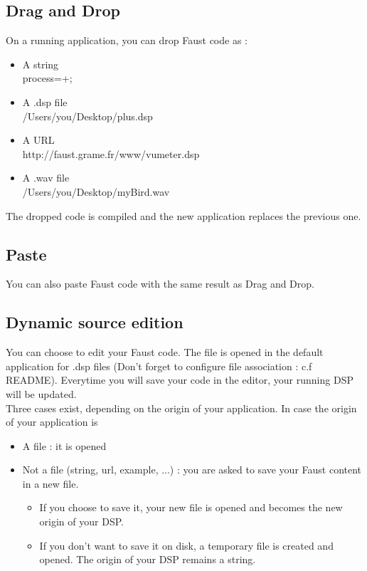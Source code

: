 \documentclass[a4paper]{article}
\begin{document}
\subsection{Drag and Drop}
On a running application, you can drop Faust code as :
\begin{itemize}
\item A string \\process=+;
\item A .dsp file \\/Users/you/Desktop/plus.dsp
\item A URL \\http://faust.grame.fr/www/vumeter.dsp
\item A .wav file \\/Users/you/Desktop/myBird.wav
\end{itemize}
The dropped code is compiled and the new application replaces the previous one.

\subsection{Paste} 
You can also paste Faust code with the same result as Drag and Drop.

\subsection{Dynamic source edition}
You can choose to edit your Faust code. The file is opened in the default application for .dsp files (Don't forget to configure file association : c.f README). Everytime you will save your code in the editor, your running DSP will be updated. \\

Three cases exist, depending on the origin of your application. In case the origin of your application is
	\begin{itemize}
		\item A file :  it is opened
		\item Not a file (string, url, example, ...) : you are asked to save your Faust content in a new file.
		\begin{itemize}
		\item If you choose to save it, your new file is opened and becomes the new origin of your DSP.
		\item If you don't want to save it on disk, a temporary file is created and opened. The origin of your DSP remains a string.
	\end{itemize}

	\end{itemize}
\end{document}
